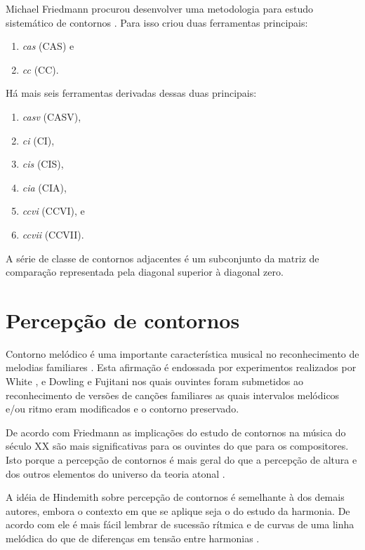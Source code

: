 \documentclass[12pt,brazil]{book}
\newcommand{\eng}[1]{\textit{#1}}
\begin{document}
Michael Friedmann procurou desenvolver uma metodologia para estudo
sistemático de contornos \cite{friedmann85:methodology}. Para isso
criou duas ferramentas principais:

\begin{enumerate}
\item \eng{\gls{cas}} (CAS) e
\item \eng{\gls{cc}} (CC).
\end{enumerate}

Há mais seis ferramentas derivadas dessas duas principais:

\begin{enumerate}
\item \eng{\gls{casv}} (CASV),
\item \eng{\gls{ci}} (CI),
\item \eng{\gls{cis}} (CIS),
\item \eng{\gls{cia}} (CIA),
\item \eng{\gls{ccvi}} (CCVI), e
\item \eng{\gls{ccvii}} (CCVII).
\end{enumerate}

A série de classe de contornos adjacentes é um subconjunto da matriz
de comparação representada pela diagonal superior à diagonal zero.

\section{Percepção de contornos}
\label{sec:perc-de-cont}

Contorno melódico é uma importante característica musical no
reconhecimento de melodias familiares
\cite[p. 136]{dowling.ea86:music}. Esta afirmação é endossada por
experimentos realizados por White \cite{white60:recognition}, e
Dowling e Fujitani \cite{dowling.ea71:contour} nos quais ouvintes
foram submetidos ao reconhecimento de versões de canções familiares as
quais intervalos melódicos e/ou ritmo eram modificados e o contorno
preservado.

De acordo com Friedmann as implicações do estudo de contornos na
música do século XX são mais significativas para os ouvintes do que
para os compositores. Isto porque a percepção de contornos é mais
geral do que a percepção de altura e dos outros elementos do universo
da teoria atonal \cite[p. 224]{friedmann85:methodology}.

A idéia de Hindemith sobre percepção de contornos é semelhante à dos
demais autores, embora o contexto em que se aplique seja o do estudo
da harmonia. De acordo com ele é mais fácil lembrar de sucessão
rítmica e de curvas de uma linha melódica do que de diferenças em
tensão entre harmonias \cite[p. 175]{hindemith41:craft}.
\end{document}
